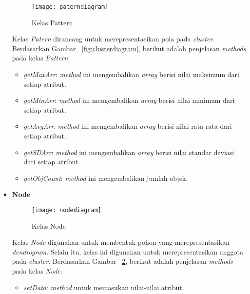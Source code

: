 \begin{itemize}
\begin{figure}[H]
    \centering  
    \texttt{[image: paterndiagram]}  
    \caption[Kelas Pattern]{Kelas Pattern} 
    \label{fig:paterndiagram} 
\end{figure}

Kelas \textit{Patern} dirancang untuk merepresentasikan pola pada \textit{cluster}. Berdasarkan Gambar ~\ref{fig:clusterdiagram}, berikut adalah penjelasan \textit{methods} pada kelas \textit{Pattern}:

\begin{itemize}

\item \textit{getMaxArr}: \textit{method} ini mengembalikan \textit{array} berisi nilai maksimum dari setiap atribut.

\item \textit{getMinArr}: \textit{method} ini mengembalikan \textit{array} berisi nilai minimum dari setiap atribut.

\item \textit{getAvgArr}: \textit{method} ini mengembalikan \textit{array} berisi nilai rata-rata dari setiap atribut.

\item \textit{getSDArr}: \textit{method} ini mengembalikan \textit{array} berisi nilai standar deviasi dari setiap atribut.

\item \textit{getObjCount}: \textit{method} ini mengembalikan jumlah objek.\\
 
\end{itemize}


\item \textbf{Node}\\

\begin{figure}[H]
    \centering  
    \texttt{[image: nodediagram]}  
    \caption[Kelas Node]{Kelas Node} 
    \label{fig:nodediagram} 
\end{figure}

Kelas \textit{Node} digunakan untuk membentuk pohon yang merepresentasikan \textit{dendrogram}. Selain itu, kelas ini digunakan untuk merepresentasikan anggota pada \textit{cluster}.  Berdasarkan Gambar ~\ref{fig:nodediagram}, berikut adalah penjelasan \textit{methods} pada kelas \textit{Node}:

\begin{itemize}

\item \textit{setData}: \textit{method} untuk memasukan nilai-nilai atribut.


\end{itemize}
\end{itemize}
